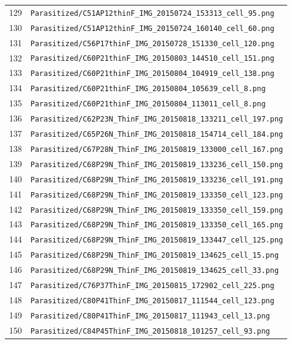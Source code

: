 \begin{longtable}{r p{12cm}}
129 & \texttt{Parasitized/C51AP12thinF\_IMG\_20150724\_153313\_cell\_95.png} \\
130 & \texttt{Parasitized/C51AP12thinF\_IMG\_20150724\_160140\_cell\_60.png} \\
131 & \texttt{Parasitized/C56P17thinF\_IMG\_20150728\_151330\_cell\_120.png} \\
132 & \texttt{Parasitized/C60P21thinF\_IMG\_20150803\_144510\_cell\_151.png} \\
133 & \texttt{Parasitized/C60P21thinF\_IMG\_20150804\_104919\_cell\_138.png} \\
134 & \texttt{Parasitized/C60P21thinF\_IMG\_20150804\_105639\_cell\_8.png} \\
135 & \texttt{Parasitized/C60P21thinF\_IMG\_20150804\_113011\_cell\_8.png} \\
136 & \texttt{Parasitized/C62P23N\_ThinF\_IMG\_20150818\_133211\_cell\_197.png} \\
137 & \texttt{Parasitized/C65P26N\_ThinF\_IMG\_20150818\_154714\_cell\_184.png} \\
138 & \texttt{Parasitized/C67P28N\_ThinF\_IMG\_20150819\_133000\_cell\_167.png} \\
139 & \texttt{Parasitized/C68P29N\_ThinF\_IMG\_20150819\_133236\_cell\_150.png} \\
140 & \texttt{Parasitized/C68P29N\_ThinF\_IMG\_20150819\_133236\_cell\_191.png} \\
141 & \texttt{Parasitized/C68P29N\_ThinF\_IMG\_20150819\_133350\_cell\_123.png} \\
142 & \texttt{Parasitized/C68P29N\_ThinF\_IMG\_20150819\_133350\_cell\_159.png} \\
143 & \texttt{Parasitized/C68P29N\_ThinF\_IMG\_20150819\_133350\_cell\_165.png} \\
144 & \texttt{Parasitized/C68P29N\_ThinF\_IMG\_20150819\_133447\_cell\_125.png} \\
145 & \texttt{Parasitized/C68P29N\_ThinF\_IMG\_20150819\_134625\_cell\_15.png} \\
146 & \texttt{Parasitized/C68P29N\_ThinF\_IMG\_20150819\_134625\_cell\_33.png} \\
147 & \texttt{Parasitized/C76P37ThinF\_IMG\_20150815\_172902\_cell\_225.png} \\
148 & \texttt{Parasitized/C80P41ThinF\_IMG\_20150817\_111544\_cell\_123.png} \\
149 & \texttt{Parasitized/C80P41ThinF\_IMG\_20150817\_111943\_cell\_13.png} \\
150 & \texttt{Parasitized/C84P45ThinF\_IMG\_20150818\_101257\_cell\_93.png} \\

\end{longtable}

